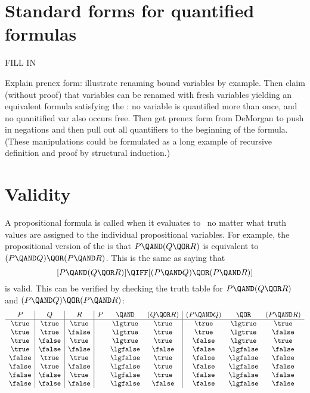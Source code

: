 \section{Standard forms for quantified formulas}
\begin{editingnotes}
FILL IN

Explain prenex form: illustrate renaming bound variables by example.
Then claim (without proof) that variables can be renamed with fresh
variables yielding an equivalent formula satisfying the : no variable is quantified more than once, and no
quanitified var also occurs free.  Then get prenex form from DeMorgan
to push in negations and then pull out all quantifiers to the
beginning of the formula.  (These manipulations could be formulated as
a long example of recursive definition and proof by structural
induction.)
\end{editingnotes}


\section{Validity}\label{sec:validity}

A propositional formula is called  when it evaluates to \true\
no matter what truth values are assigned to the individual propositional
variables.  For example, the propositional version of the 
is that $P \QAND (Q \QOR R)$ is equivalent to $(P \QAND Q) \QOR (P \QAND
R)$.  This is the same as saying that
\begin{equation}\label{eq:distributive_law}
[P \QAND (Q \QOR R)] \QIFF [(P \QAND Q) \QOR (P \QAND R)]
\end{equation}
is valid.  This can be verified by checking the truth table for $P
\QAND (Q \QOR R)$ and $(P \QAND Q) \QOR (P \QAND R)$:
\begin{equation*}
\begin{array}{c|c|c|ccc|ccc}
P & Q & R & P & \QAND & (Q \QOR R) & (P \QAND Q) &  \QOR & (P \QAND R) \\
\hline

\true & \true  & \true   && \lgtrue  &\true &\true & \lgtrue  &\true \\
\true & \true  & \false  && \lgtrue  &\true &\true & \lgtrue  &\false\\
\true & \false & \true   && \lgtrue  &\true &\false& \lgtrue  &\true \\
\true & \false & \false  && \lgfalse &\false&\false& \lgfalse &\false\\

\false & \true  & \true  && \lgfalse &\true &\false& \lgfalse &\false\\
\false & \true  & \false && \lgfalse &\true &\false& \lgfalse &\false\\
\false & \false & \true  && \lgfalse &\true &\false& \lgfalse &\false\\
\false & \false & \false && \lgfalse &\false&\false& \lgfalse &\false

\end{array}
\end{equation*}

